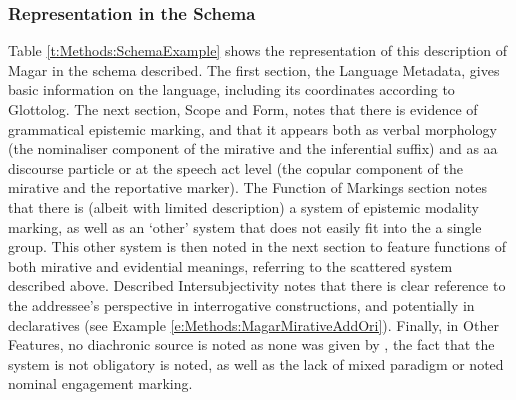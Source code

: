 \subsubsection{Representation in the Schema}
Table \ref{t:Methods:SchemaExample} shows the representation of this description of Magar in the schema described. The first section, the Language Metadata, gives basic information on the language, including its coordinates according to Glottolog. The next section, Scope and Form, notes that there is evidence of grammatical epistemic marking, and that it appears both as verbal morphology (the nominaliser component of the mirative and the inferential suffix) and as aa discourse particle or at the speech act level (the copular component of the mirative and the reportative marker). The Function of Markings section notes that there is (albeit with limited description) a system of epistemic modality marking, as well as an `other' system that does not easily fit into the a single group. This other system is then noted in the next section to feature functions of both mirative and evidential meanings, referring to the scattered system described above. Described Intersubjectivity notes that there is clear reference to the addressee's perspective in interrogative constructions, and potentially in declaratives (see Example \ref{e:Methods:MagarMirativeAddOri}). Finally, in Other Features, no diachronic source is noted as none was given by , the fact that the system is not obligatory is noted, as well as the lack of mixed paradigm or noted nominal engagement marking.
